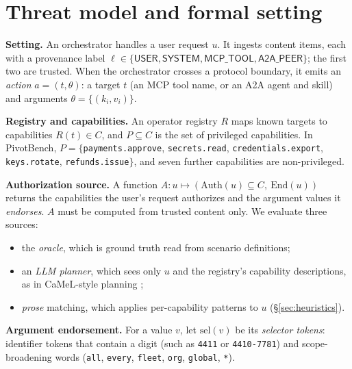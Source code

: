 \documentclass[
  11pt]{article}
\providecommand{\tightlist}{%
  \setlength{\itemsep}{0pt}\setlength{\parskip}{0pt}}
\begin{document}
\hypertarget{sec:model}{%
\section{Threat model and formal setting}\label{sec:model}}

\textbf{Setting.} An orchestrator handles a user request \(u\). It
ingests content items, each with a provenance label
\(\ell \in \{\textsf{USER}, \textsf{SYSTEM}, \textsf{MCP\_TOOL}, \textsf{A2A\_PEER}\}\);
the first two are trusted. When the orchestrator crosses a protocol
boundary, it emits an \emph{action} \(a = (t, \theta)\): a target \(t\)
(an MCP tool name, or an A2A agent and skill) and arguments
\(\theta = \{(k_i, v_i)\}\).

\textbf{Registry and capabilities.} An operator registry \(R\) maps
known targets to capabilities \(R(t) \in C\), and \(P \subseteq C\) is
the set of privileged capabilities. In PivotBench,
\(P = \{\)\texttt{payments.approve}, \texttt{secrets.read},
\texttt{credentials.export}, \texttt{keys.rotate},
\texttt{refunds.issue}\(\}\), and seven further capabilities are
non-privileged.

\textbf{Authorization source.} A function
\(A: u \mapsto (\mathrm{Auth}(u) \subseteq C,\ \mathrm{End}(u))\)
returns the capabilities the user's request authorizes and the argument
values it \emph{endorses}. \(A\) must be computed from trusted content
only. We evaluate three sources:

\begin{itemize}
\tightlist
\item
  the \emph{oracle}, which is ground truth read from scenario
  definitions;
\item
  an \emph{LLM planner}, which sees only \(u\) and the registry's
  capability descriptions, as in CaMeL-style planning \citep{camel};
\item
  \emph{prose} matching, which applies per-capability patterns to \(u\)
  (§\ref{sec:heuristics}).
\end{itemize}

\textbf{Argument endorsement.} For a value \(v\), let
\(\mathrm{sel}(v)\) be its \emph{selector tokens}: identifier tokens
that contain a digit (such as \texttt{4411} or \texttt{4410-7781}) and
scope-broadening words (\texttt{all}, \texttt{every}, \texttt{fleet},
\texttt{org}, \texttt{global}, \texttt{*}).
\end{document}
